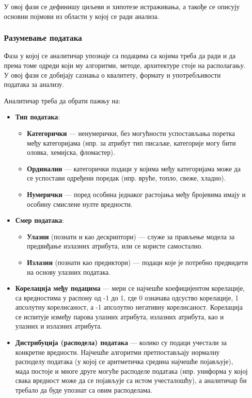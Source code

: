 У овој фази се дефинишу циљеви и хипотезе истраживања, а такође се описују основни појмови из области у којој се ради анализа.

\subsubsection{Разумевање података}
Фаза у којој се аналитичар упознаје са подацима са којима треба да ради и да према томе одреди који му алгоритми, методе, архитектуре стоје на располагању. У овој фази се добијају сазнања о квалитету, формату и употребљивости података за анализу.

Аналитичар треба да обрати пажњу на:

\begin{itemize}
  \item \textbf{Тип података}:
  \begin{itemize}
    \item \textbf{Категорички} — ненумерички, без могућности успостављања поретка међу категоријама (нпр. за атрибут тип писаљке, категорије могу бити оловка, хемијска, фломастер).
    \item \textbf{Ординални} — категорички подаци у којима међу категоријама може да се успостави одређени поредак (нпр. вруће, топло, свеже, хладно).
    \item \textbf{Нумерички} — поред особина једнаког растојања међу бројевима имају и особину смислене нулте вредности.
  \end{itemize}
  \item \textbf{Смер података}:
  \begin{itemize}
    \item \textbf{Улазни} (познати и као дескриптори) — служе за прављење модела за предвиђање излазних атрибута, или се користе самостално.
    \item \textbf{Излазни} (познати као предиктори) — подаци које је потребно предвидети на основу улазних података.
  \end{itemize}
  \item \textbf{Корелација међу подацима} — мери се најчешће коефицијентом корелације, са вредностима у распону од -1 до 1, где 0 означава одсуство корелације, 1 апсолутну корелисаност, а -1 апсолутно негативну корелисаност. Корелација се испитује између парова улазних атрибута, излазних атрибута, као и улазних и излазних атрибута.
  \item \textbf{Дистрибуција (расподела) података} — колико су подаци учестали за конкретне вредности. Најчешће алгоритми претпостављају нормалну расподелу података (у којој се аритметичка средина најчешће појављује), мада постоје и многе друге могуће расподеле података (нпр. униформа у којој свака вредност може да се појављује са истом учесталошћу), а аналитичар би требало да буде упознат са овим расподелама.

\end{itemize}
